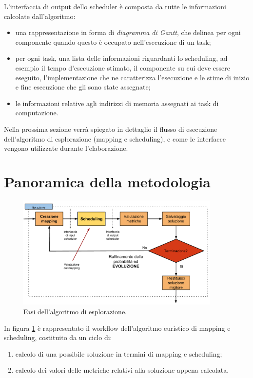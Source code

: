 L'interfaccia di output dello scheduler è composta da tutte le informazioni
calcolate dall'algoritmo:
\begin{itemize}
 \item una rappresentazione in forma di \emph{diagramma di Gantt}, che delinea 
per ogni componente quando questo è occupato nell'esecuzione di un task;
 \item per ogni task, una lista delle informazioni riguardanti lo scheduling, 
ad esempio il tempo d'esecuzione stimato, il componente su cui deve essere 
eseguito, l'implementazione che ne caratterizza l'esecuzione e le stime di 
inizio e fine esecuzione che gli sono state assegnate;
 \item le informazioni relative agli indirizzi di memoria assegnati ai task
 di computazione.
\end{itemize}

Nella prossima sezione verrà spiegato in dettaglio il flusso di 
esecuzione dell'algoritmo di esplorazione (mapping e scheduling), e come le
interfacce vengono utilizzate durante l'elaborazione.


\section{Panoramica della metodologia}
\label{sec:panoramicaMetodologia}

\begin{figure}
 \begin{center}
  \includegraphics[width=0.9\textwidth]{capitoli/figure/cap4/MapperWorkflow.pdf}
  \caption{Fasi dell'algoritmo di esplorazione.}
  \label{fig:flussoDettagliatoACO}
 \end{center}
\end{figure}

In figura \ref{fig:flussoDettagliatoACO} \`e rappresentato il workflow
dell'algoritmo euristico di mapping e scheduling, costituito da un ciclo di:
\begin{enumerate}
  \item calcolo di una possibile soluzione in termini di mapping e scheduling;
  \item calcolo dei valori delle metriche relativi alla soluzione appena calcolata.
\end{enumerate}

